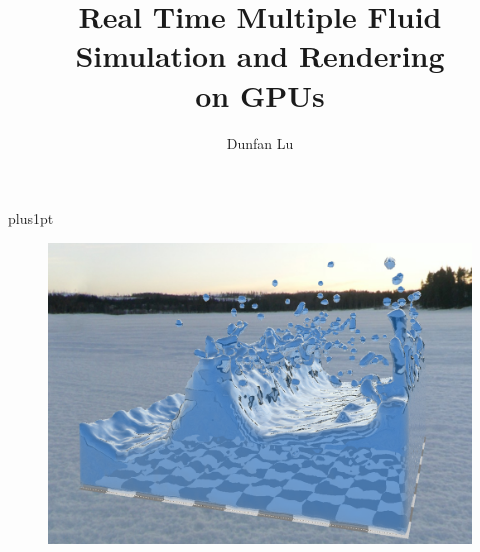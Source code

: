 \documentclass[12pt]{ociamthesis}  %
\title{
        Real Time Multiple Fluid  \\
        Simulation and Rendering \\
        on GPUs}   %
\author{Dunfan Lu}             %
\begin{document}
\baselineskip=18pt plus1pt

\setcounter{secnumdepth}{3}
\setcounter{tocdepth}{3}


\maketitle                  %

\begin{figure}[p]
        \centering
        \begin{minipage}[t]{.99\linewidth}
                \vspace{0pt}
                \centering
                \includegraphics[width=14cm]{FrontSinglephase_cropped}
        \end{minipage}
        
        \hspace{5pt}


\end{figure}
\end{document}
